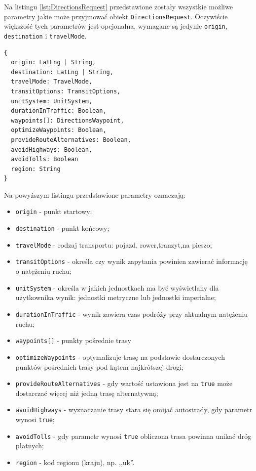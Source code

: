 \documentclass[eng,printmode,oneside]{mgr}
\begin{document}
Na listingu \ref{lst:DirectionsRequest} przedstawione zostały wszystkie możliwe
parametry jakie może przyjmować obiekt \texttt{DirectionsRequest}. Oczywiście
większość tych parametrów jest opcjonalna, wymagane są jedynie \texttt{origin},
\texttt{destination} i \texttt{travelMode}.

\begin{lstlisting}[caption=Parametry jakie może
przyjmować obiekt typu \texttt{DirectionsRequest},label=lst:DirectionsRequest] 
{
  origin: LatLng | String,
  destination: LatLng | String,
  travelMode: TravelMode,
  transitOptions: TransitOptions,
  unitSystem: UnitSystem,
  durationInTraffic: Boolean,
  waypoints[]: DirectionsWaypoint,
  optimizeWaypoints: Boolean,
  provideRouteAlternatives: Boolean,
  avoidHighways: Boolean,
  avoidTolls: Boolean
  region: String
}
\end{lstlisting}

Na powyższym listingu przedstawione parametry oznaczają:
\begin{itemize}
  \item \texttt{origin} - punkt startowy;
  \item \texttt{destination} - punkt końcowy;
  \item \texttt{travelMode} - rodzaj transportu: pojazd, rower,tranzyt,na
  pieszo;
  \item \texttt{transitOptions} - określa czy wynik zapytania powinien zawierać
  informację o natężeniu ruchu;
  \item \texttt{unitSystem} - określa w jakich jednostkach ma być wyświetlany
  dla użytkownika wynik: jednostki metryczne lub jednostki imperialne;
  \item \texttt{durationInTraffic} - wynik zawiera czas podróży przy aktualnym
  natężeniu ruchu;
  \item \texttt{waypoints[]} - punkty pośrednie trasy
  \item \texttt{optimizeWaypoints} - optymalizuje trasę na podstawie
  dostarczonych punktów pośrednich trasy pod kątem najkrótszej drogi;
  \item \texttt{provideRouteAlternatives} - gdy wartość ustawiona jest na
  \texttt{true} może dostarczać więcej niż jedną trasę alternatywną;
  \item \texttt{avoidHighways} - wyznaczanie trasy stara się omijać autostrady,
  gdy parametr wynosi \texttt{true};
  \item \texttt{avoidTolls} - gdy parametr wynosi \texttt{true} obliczona trasa
  powinna unikać dróg płatnych;
  \item \texttt{region} - kod regionu (kraju), np. ,,uk''.
\end{itemize}
\end{document}

